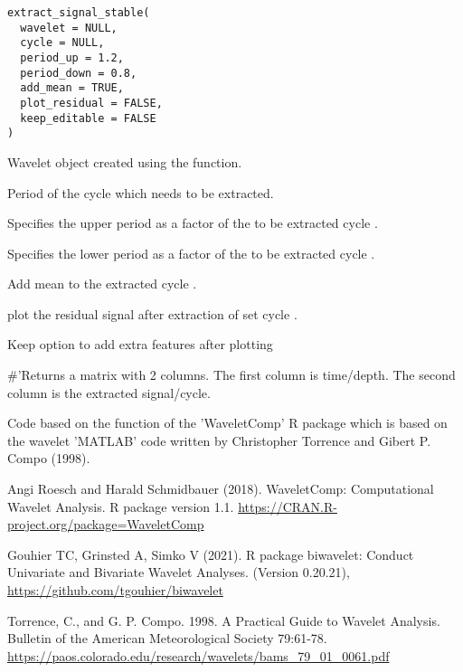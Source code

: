 \documentclass[a4paper]{book}
\begin{document}
%
\begin{Usage}
\begin{verbatim}
extract_signal_stable(
  wavelet = NULL,
  cycle = NULL,
  period_up = 1.2,
  period_down = 0.8,
  add_mean = TRUE,
  plot_residual = FALSE,
  keep_editable = FALSE
)
\end{verbatim}
\end{Usage}
%
\begin{Arguments}
\begin{ldescription}
\item[\code{wavelet}] Wavelet object created using the  function.

\item[\code{cycle}] Period of the cycle which needs to be extracted.

\item[\code{period\_up}] Specifies the upper period as a factor of the to be extracted cycle .

\item[\code{period\_down}] Specifies the lower period as a factor of the to be extracted cycle .

\item[\code{add\_mean}] Add mean to the extracted cycle .

\item[\code{plot\_residual}] plot the residual signal after extraction of set cycle .

\item[\code{keep\_editable}] Keep option to add extra features after plotting  
\end{ldescription}
\end{Arguments}
%
\begin{Value}
\#'Returns a matrix with 2 columns.
The first column is time/depth.
The second column is the extracted signal/cycle.
\end{Value}
%
\begin{Author}
Code based on the  function of the 'WaveletComp' R package
which is based on the wavelet 'MATLAB' code written by Christopher Torrence and Gibert P. Compo (1998).
\end{Author}
%
\begin{References}
Angi Roesch and Harald Schmidbauer (2018). WaveletComp: Computational
Wavelet Analysis. R package version 1.1.
\url{https://CRAN.R-project.org/package=WaveletComp}

Gouhier TC, Grinsted A, Simko V (2021). R package biwavelet: Conduct Univariate and Bivariate Wavelet Analyses. (Version 0.20.21),
\url{https://github.com/tgouhier/biwavelet}

Torrence, C., and G. P. Compo. 1998. A Practical Guide to Wavelet Analysis.
Bulletin of the American Meteorological Society 79:61-78.
\url{https://paos.colorado.edu/research/wavelets/bams_79_01_0061.pdf}
\end{References}
\end{document}
